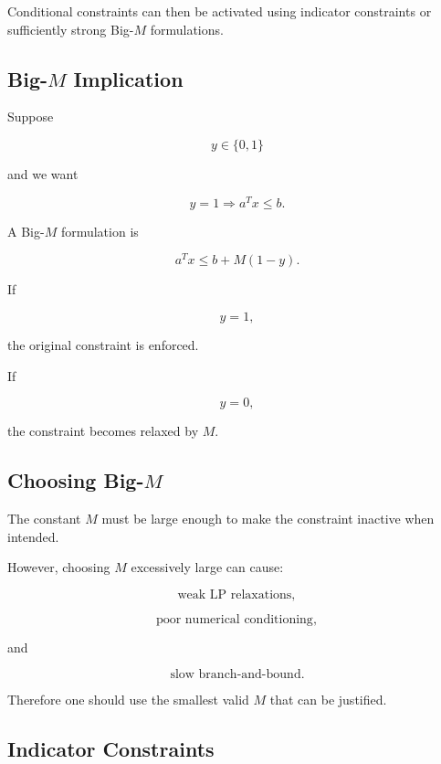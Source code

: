 Conditional constraints can then be activated using indicator constraints
or sufficiently strong Big-\(M\) formulations.

\subsection{Big-\(M\) Implication}
\label{subsec:big-m-implication}

Suppose

\[
y\in\{0,1\}
\]

and we want

\[
\boxed{
y=1
\Rightarrow
a^Tx\leq b.
}
\]

A Big-\(M\) formulation is

\[
\boxed{
a^Tx
\leq
b
+
M(1-y).
}
\]

If

\[
y=1,
\]

the original constraint is enforced.

If

\[
y=0,
\]

the constraint becomes relaxed by \(M\).

\subsection{Choosing Big-\(M\)}
\label{subsec:choosing-big-m}

The constant \(M\) must be large enough to make the constraint inactive
when intended.

However, choosing \(M\) excessively large can cause:

\[
\boxed{
\text{weak LP relaxations},
}
\]

\[
\boxed{
\text{poor numerical conditioning},
}
\]

and

\[
\boxed{
\text{slow branch-and-bound}.
}
\]

Therefore one should use the smallest valid \(M\) that can be justified.

\subsection{Indicator Constraints}
\label{subsec:indicator-constraints}

